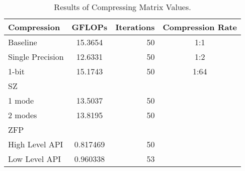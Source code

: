 \begin{table}
	\centering
	\begin{tabular}{l|S|r|c}
		Compression & GFLOPs & Iterations & Compression Rate\\
		\hline
		Baseline & 15.3654 & 50 & 1:1 \\
		Single Precision & 12.6331 & 50 & 1:2 \\
		1-bit & 15.1743 & 50 & 1:64 \\ %
		SZ & & & \\
		\hspace{3mm} 1 mode & 13.5037 & 50 & \\
		\hspace{3mm} 2 modes & 13.8195 & 50 & \\
		ZFP & & & \\
		\hspace{3mm}High Level API & 0.817469 & 50 & \\
		\hspace{3mm}Low Level API & 0.960338 & 53 & \\
	\end{tabular}
	\caption{Results of Compressing Matrix Values.}
	\label{tab:results-val}
\end{table}
